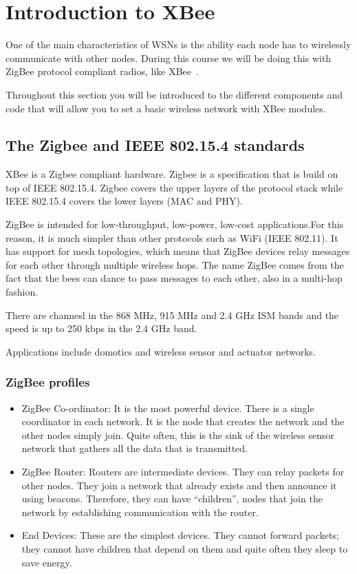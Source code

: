 \chapter{Introduction to XBee}\label{introToXBee}


One of the main characteristics of WSNs is the ability each node has to wirelessly communicate with other nodes. 
During this course we will be doing this with ZigBee protocol compliant radios, like XBee~\cite{faludi2010bws}.

Throughout this section you will be introduced to the different components and code that will allow you to set a basic wireless network with XBee modules.

\section{The Zigbee and IEEE 802.15.4 standards}

XBee is a Zigbee compliant hardware.
Zigbee is a specification that is build on top of IEEE 802.15.4.
Zigbee covers the upper layers of the protocol stack while IEEE 802.15.4 covers the lower layers (MAC and PHY).

ZigBee is intended for low-throughput, low-power, low-cost applications.For this reason, it is much simpler than other protocols such as WiFi (IEEE 802.11).
It has support for mesh topologies, which means that ZigBee devices relay messages for each other through multiple wireless hops.
The name ZigBee comes from the fact that the bees can dance to pass messages to each other, also in a multi-hop fashion.

There are channesl in the 868 MHz, 915 MHz and 2.4 GHz ISM bands and the speed is up to 250 kbps in the 2.4 GHz band.

Applications include domotics and wireless sensor and actuator networks.

\subsection{ZigBee profiles}
\begin{itemize}
\item ZigBee Co-ordinator: It is the most powerful device. There is a single coordinator in each network.
It is the node that creates the network and the other nodes simply join.
Quite often, this is the sink of the wireless sensor network that gathers all the data that is transmitted.
\item ZigBee Router: Routers are intermediate devices.
They can relay packets for other nodes.
They join a network that already exists and then announce it using beacons.
Therefore, they can have ``children'', nodes that join the network by establishing communication with the router.
\item End Devices:
These are the simplest devices.
They cannot forward packets; they cannot have children that depend on them and quite often they sleep to save energy.
\end{itemize}

